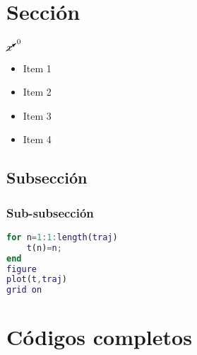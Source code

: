 \documentclass[12pt]{article}  %
\begin{document}
\section{Sección}
\cite{gh1562} %

$\cancelto{0}{x}$ %
\begin{itemize}
    \item Item 1
    \item Item 2
    \item Item 3
    \item Item 4
\end{itemize}

\subsection{Subsección}
\cite{Agarwal2019} %
\subsubsection{Sub-subsección}


\newpage

\begin{lstlisting}[language=matlab, caption=Código de matlab]
  for n=1:1:length(traj)
    t(n)=n;
end
figure
plot(t,traj)
grid on
\end{lstlisting}

\newpage %
\appendix %
\section{Códigos completos}


\clearpage %
\end{document}
